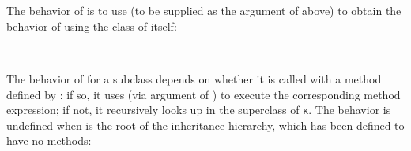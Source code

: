 \begin{AgdaAlign}
\begin{code}
\\
%
\>[4]\AgdaSpace{}%
\AgdaSymbol{:}\AgdaSpace{}%
\AgdaSpace{}%
\AgdaSpace{}%
\<%
\\
%
\>[4]%
\>[353I]\AgdaSymbol{(}\AgdaSpace{}%
\AgdaOperator{\AgdaInductiveConstructor{,}}\AgdaSpace{}%
\AgdaSpace{}%
\AgdaOperator{\AgdaInductiveConstructor{,}}\AgdaSpace{}%
\AgdaSymbol{)}\AgdaSpace{}%
\AgdaSymbol{=}\AgdaSpace{}%
\AgdaSymbol{(}\AgdaSpace{}%
\AgdaOperator{\AgdaInductiveConstructor{,}}\AgdaSpace{}%
\AgdaSpace{}%
\AgdaOperator{\AgdaInductiveConstructor{,}}\AgdaSpace{}%
\AgdaSymbol{)}\AgdaSpace{}%
\<%
\end{code}
%
The behavior of  is to use  
(to be supplied as the argument  of  above)
to obtain the behavior of  using the class of  itself:
%
\begin{code}%
\>[.][@{}l@{}]\<[353I]%
\>[6]\AgdaSpace{}%
\AgdaSymbol{:}\AgdaSpace{}%
\AgdaSpace{}%
\AgdaSpace{}%
\AgdaSpace{}%
\AgdaSpace{}%
\<%
\\
%
\>[6]\AgdaSpace{}%
\AgdaSpace{}%
\AgdaSymbol{=}\AgdaSpace{}%
\AgdaSpace{}%
\AgdaSymbol{(}\AgdaSpace{}%
\AgdaSymbol{)}\AgdaSpace{}%
\<%
\end{code}
%
The behavior of  for a subclass  
depends on whether it is called with a method  defined by :
if so, it uses  (via argument  of )
to execute the corresponding method expression;
if not, it recursively looks up  in the superclass of {κ}.
The behavior is undefined when  is the root of the inheritance hierarchy,
which has been defined to have no methods:
%
\begin{code}%
%
\>[6]\AgdaSpace{}%
\AgdaSymbol{:}\AgdaSpace{}%
\AgdaSpace{}%
\AgdaSpace{}%
\AgdaSpace{}%
\AgdaSpace{}%
\AgdaSpace{}%
\AgdaSpace{}%

\end{code}
\end{AgdaAlign}
